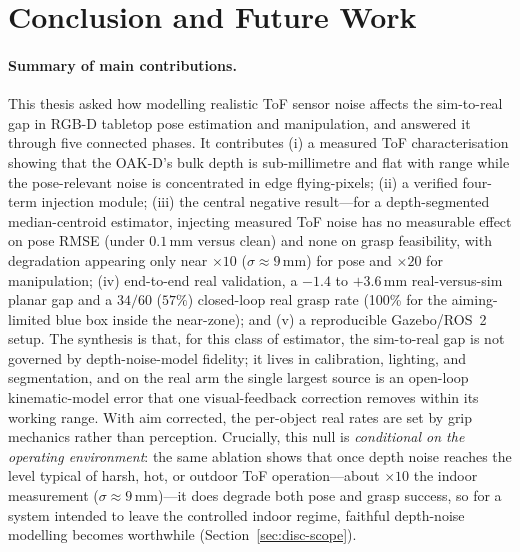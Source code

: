 \section{Conclusion and Future Work}\label{sec:conclusion}

\paragraph{Summary of main contributions.}
This thesis asked how modelling realistic ToF sensor noise affects the sim-to-real gap in
RGB-D tabletop pose estimation and manipulation, and answered it through five connected
phases. It contributes (i) a measured ToF characterisation showing that the OAK-D's bulk
depth is sub-millimetre and flat with range while the pose-relevant noise is concentrated in
edge flying-pixels; (ii) a verified four-term injection module; (iii) the central negative
result---for a depth-segmented median-centroid estimator, injecting measured ToF noise has no
measurable effect on pose RMSE (under $0.1$\,mm versus clean) and none on grasp feasibility,
with degradation appearing only near $\times10$ ($\sigma\approx9$\,mm) for pose and $\times20$
for manipulation; (iv) end-to-end real validation, a $-1.4$ to $+3.6$\,mm real-versus-sim
planar gap and a $34/60$ ($57\%$) closed-loop real grasp rate (100\% for the aiming-limited
blue box inside the near-zone); and (v) a reproducible Gazebo/ROS~2 setup. The synthesis is
that, for this class of estimator, the sim-to-real gap is not governed by depth-noise-model
fidelity; it lives in calibration, lighting, and segmentation, and on the real arm the single
largest source is an open-loop kinematic-model error that one visual-feedback correction
removes within its working range. With aim corrected, the per-object real rates are set by
grip mechanics rather than perception. Crucially, this null is \emph{conditional on the
operating environment}: the same ablation shows that once depth noise reaches the level
typical of harsh, hot, or outdoor ToF operation---about $\times10$ the indoor measurement
($\sigma\approx9$\,mm)---it does degrade both pose and grasp success, so for a system
intended to leave the controlled indoor regime, faithful depth-noise modelling becomes
worthwhile (Section~\ref{sec:disc-scope}).

